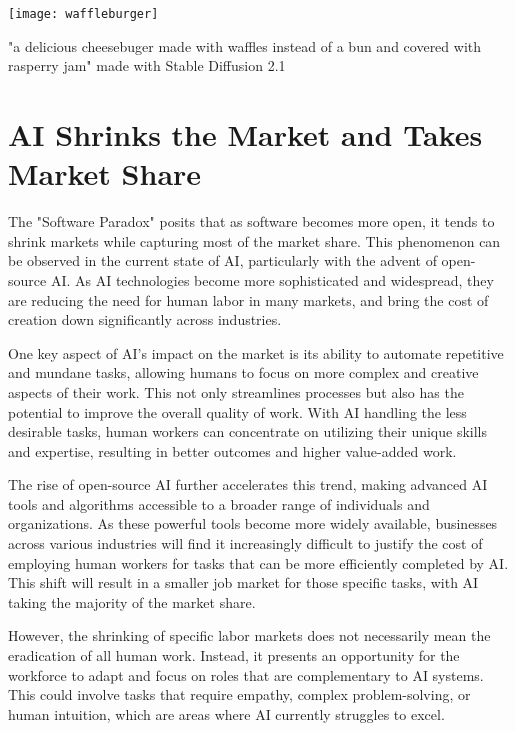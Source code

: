 \begin{marginfigure}[-5.5cm]
    \texttt{[image: waffleburger]}
        \caption{"a delicious cheesebuger made with waffles instead of a bun and covered with rasperry jam" made with Stable Diffusion 2.1}
\end{marginfigure}

\section{AI Shrinks the Market and Takes Market Share}

The "Software Paradox" posits that as software becomes more open, it tends to shrink markets while capturing most of the market share. This phenomenon can be observed in the current state of AI, particularly with the advent of open-source AI. As AI technologies become more sophisticated and widespread, they are reducing the need for human labor in many markets, and bring the cost of creation down significantly across industries.

One key aspect of AI's impact on the market is its ability to automate repetitive and mundane tasks, allowing humans to focus on more complex and creative aspects of their work. This not only streamlines processes but also has the potential to improve the overall quality of work. With AI handling the less desirable tasks, human workers can concentrate on utilizing their unique skills and expertise, resulting in better outcomes and higher value-added work.

The rise of open-source AI further accelerates this trend, making advanced AI tools and algorithms accessible to a broader range of individuals and organizations. As these powerful tools become more widely available, businesses across various industries will find it increasingly difficult to justify the cost of employing human workers for tasks that can be more efficiently completed by AI. This shift will result in a smaller job market for those specific tasks, with AI taking the majority of the market share.

However, the shrinking of specific labor markets does not necessarily mean the eradication of all human work. Instead, it presents an opportunity for the workforce to adapt and focus on roles that are complementary to AI systems. This could involve tasks that require empathy, complex problem-solving, or human intuition, which are areas where AI currently struggles to excel.

